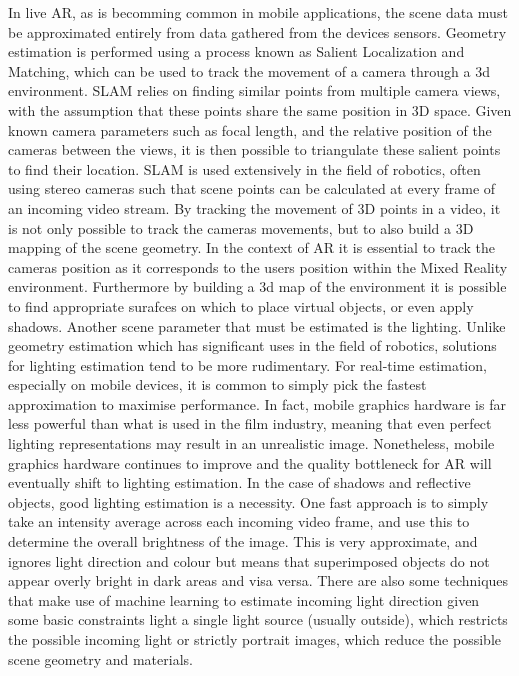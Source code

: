 \documentclass[ %
                    author={Gavin Parker},
                supervisor={Dr. Neill Campbell},
                    degree={MEng},
                     title={Deep Siamese Networks for Illumination Estimation from Stereo Images},
                  subtitle={},
                      type={research},
                      year={2018} ]{dissertation}
\begin{document}
\newline
In live AR, as is becomming common in mobile applications, the scene data must be approximated entirely from data gathered from the devices sensors. Geometry estimation is performed using a process known as Salient Localization and Matching, which can be used to track the movement of a camera through a 3d environment. SLAM relies on finding similar points from multiple camera views, with the assumption that these points share the same position in 3D space. Given known camera parameters such as focal length, and the relative position of the cameras between the views, it is then possible to triangulate these salient points to find their location. SLAM is used extensively in the field of robotics, often using stereo cameras such that scene points can be calculated at every frame of an incoming video stream. By tracking the movement of 3D points in a video, it is not only possible to track the cameras movements, but to also build a 3D mapping of the scene geometry. In the context of AR it is essential to track the cameras position as it corresponds to the users position within the Mixed Reality environment. Furthermore by building a 3d map of the environment it is possible to find appropriate surafces on which to place virtual objects, or even apply shadows.
\newline
Another scene parameter that must be estimated is the lighting. Unlike geometry estimation which has significant uses in the field of robotics, solutions for lighting estimation tend to be more rudimentary. For real-time estimation, especially on mobile devices, it is common to simply pick the fastest approximation to maximise performance. In fact, mobile graphics hardware is far less powerful than what is used in the film industry, meaning that even perfect lighting representations may result in an unrealistic image. Nonetheless, mobile graphics hardware continues to improve and the quality bottleneck for AR will eventually shift to lighting estimation. In the case of shadows and reflective objects, good lighting estimation is a necessity. One fast approach is to simply take an intensity average across each incoming video frame, and use this to determine the overall brightness of the image. This is very approximate, and ignores light direction and colour but means that superimposed objects do not appear overly bright in dark areas and visa versa. There are also some techniques that make use of machine learning to estimate incoming light direction given some basic constraints light a single light source (usually outside), which restricts the possible incoming light or strictly portrait images, which reduce the possible scene geometry and materials.
\end{document}
